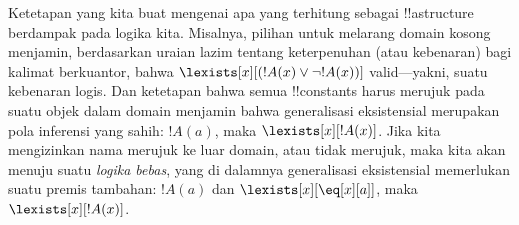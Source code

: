 \documentclass[../../../include/open-logic-section]{subfiles}
\begin{document}
\begin{digress}
Ketetapan yang kita buat mengenai apa yang terhitung sebagai !!a{structure}
berdampak pada logika kita. Misalnya, pilihan untuk melarang domain kosong
menjamin, berdasarkan uraian lazim tentang keterpenuhan (atau kebenaran) bagi
kalimat berkuantor, bahwa $\lexists[x][(!A(x) \lor \lnot !A(x))]$
valid---yakni, suatu kebenaran logis. Dan ketetapan bahwa semua !!{constant}s
harus merujuk pada suatu objek dalam domain menjamin bahwa generalisasi
eksistensial merupakan pola inferensi yang sahih: $!A(a)$, maka
$\lexists[x][!A(x)]$. Jika kita mengizinkan nama merujuk ke luar domain,
atau tidak merujuk, maka kita akan menuju suatu \emph{logika bebas}, yang di
dalamnya generalisasi eksistensial memerlukan suatu premis tambahan:
$!A(a)$ dan $\lexists[x][\eq[x][a]]$, maka $\lexists[x][!A(x)]$.
\end{digress}
\end{document}
